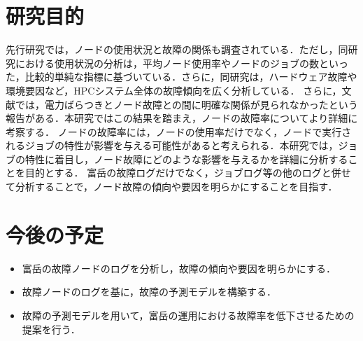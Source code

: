 \documentclass[a4paper,11pt,twocolumn]{jsarticle}
\begin{document}
\section{研究目的}
先行研究\cite{HPC_system_fail}では，ノードの使用状況と故障の関係も調査されている．ただし，同研究における使用状況の分析は，平均ノード使用率やノードのジョブの数といった，比較的単純な指標に基づいている．さらに，同研究は，ハードウェア故障や環境要因など，HPCシステム全体の故障傾向を広く分析している．
さらに，文献\cite{master_kusaba}では，電力ばらつきとノード故障との間に明確な関係が見られなかったという報告がある．本研究ではこの結果を踏まえ，ノードの故障率についてより詳細に考察する．
ノードの故障率には，ノードの使用率だけでなく，ノードで実行されるジョブの特性が影響を与える可能性があると考えられる．本研究では，ジョブの特性に着目し，ノード故障にどのような影響を与えるかを詳細に分析することを目的とする．
富岳の故障ログだけでなく，ジョブログ等の他のログと併せて分析することで，ノード故障の傾向や要因を明らかにすることを目指す．


\section{今後の予定}

\begin{itemize}
  \item 富岳の故障ノードのログを分析し，故障の傾向や要因を明らかにする．
  \item 故障ノードのログを基に，故障の予測モデルを構築する．
  \item 故障の予測モデルを用いて，富岳の運用における故障率を低下させるための提案を行う．
\end{itemize}



\end{document}
